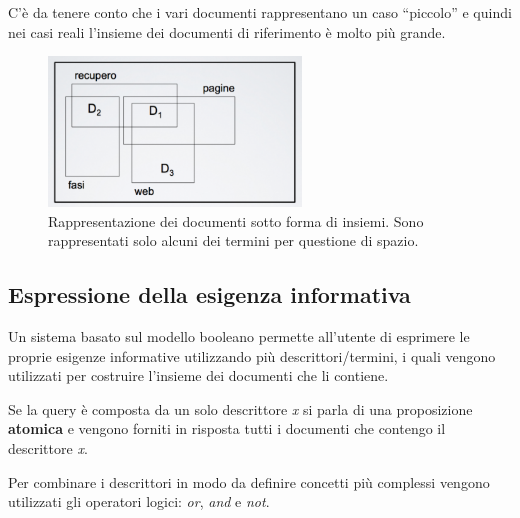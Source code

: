 C'è da tenere conto che i vari documenti rappresentano un caso ``piccolo'' e quindi nei casi reali l'insieme dei documenti di riferimento è molto più grande.

\begin{figure}[htbp]
	\centering
	\includegraphics[width=0.6\textwidth]{./images/l7-insieme}
	\caption{Rappresentazione dei documenti sotto forma di insiemi. Sono rappresentati solo alcuni dei termini per questione di spazio.}
\end{figure}

\subsection{Espressione della esigenza informativa}

Un sistema basato sul modello booleano permette all'utente di esprimere le proprie esigenze informative utilizzando più descrittori/termini, i quali vengono utilizzati per costruire l'insieme dei documenti che li contiene.

Se la query è composta da un solo descrittore \textit{x} si parla di una proposizione \textbf{atomica} e vengono forniti in risposta tutti i documenti che contengo il descrittore \textit{x}.

Per combinare i descrittori in modo da definire concetti più complessi vengono utilizzati gli operatori logici: \textit{or}, \textit{and} e \textit{not}.

